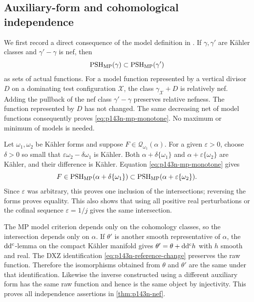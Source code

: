 \subsection{Auxiliary-form and cohomological independence}

We first record a direct consequence of the model definition in
\cite[Definitions~4.1.2 and 4.3.1]{MP24}. If \(\gamma,\gamma'\)
are K\"ahler classes and \(\gamma'-\gamma\) is nef, then
\begin{equation}\label{eq:p143n-mp-monotone}
 \operatorname{PSH}_{\mathrm{MP}}(\gamma)\subset
 \operatorname{PSH}_{\mathrm{MP}}(\gamma')
\end{equation}
as sets of actual functions. For a model function represented by a
vertical divisor \(D\) on a dominating test configuration
\(\mathcal X\), the class \(\gamma_{\mathcal X}+D\) is relatively
nef. Adding the pullback of the nef class \(\gamma'-\gamma\)
preserves relative nefness. The function represented by \(D\) has
not changed. The same decreasing net of model functions consequently
proves \eqref{eq:p143n-mp-monotone}. No maximum or minimum of models
is needed.

Let \(\omega_1,\omega_2\) be K\"ahler forms and suppose
\(F\in\mathcal Q_{\omega_1}(\alpha)\). For a given
\(\varepsilon>0\), choose \(\delta>0\) so small that
\(\varepsilon\omega_2-\delta\omega_1\) is K\"ahler. Both
\(\alpha+\delta\{\omega_1\}\) and
\(\alpha+\varepsilon\{\omega_2\}\) are K\"ahler, and their
difference is K\"ahler. Equation \eqref{eq:p143n-mp-monotone} gives
\[
 F\in\operatorname{PSH}_{\mathrm{MP}}(\alpha+\delta\{\omega_1\})
 \subset\operatorname{PSH}_{\mathrm{MP}}(\alpha+\varepsilon\{\omega_2\}).
\]
Since \(\varepsilon\) was arbitrary, this proves one inclusion of
the intersections; reversing the forms proves equality. This also
shows that using all positive real perturbations or the cofinal
sequence \(\varepsilon=1/j\) gives the same intersection.

The MP model criterion depends only on the cohomology classes, so the
intersection depends only on \(\alpha\). If \(\theta'\) is another
smooth representative of \(\alpha\), the \(\mathrm d\mathrm d^{\mathrm c}\)-lemma on the
compact K\"ahler manifold gives \(\theta'=\theta+\mathrm d\mathrm d^{\mathrm c} h\) with
\(h\) smooth and real. The DXZ identification
\eqref{eq:p143n-reference-change} preserves the raw function.
Therefore the isomorphisms obtained from \(\theta\) and \(\theta'\)
are the same under that identification. Likewise the inverse
constructed using a different auxiliary form has the same raw
function and hence is the same object by injectivity. This proves
all independence assertions in \cref{thm:p143n-nef}.
